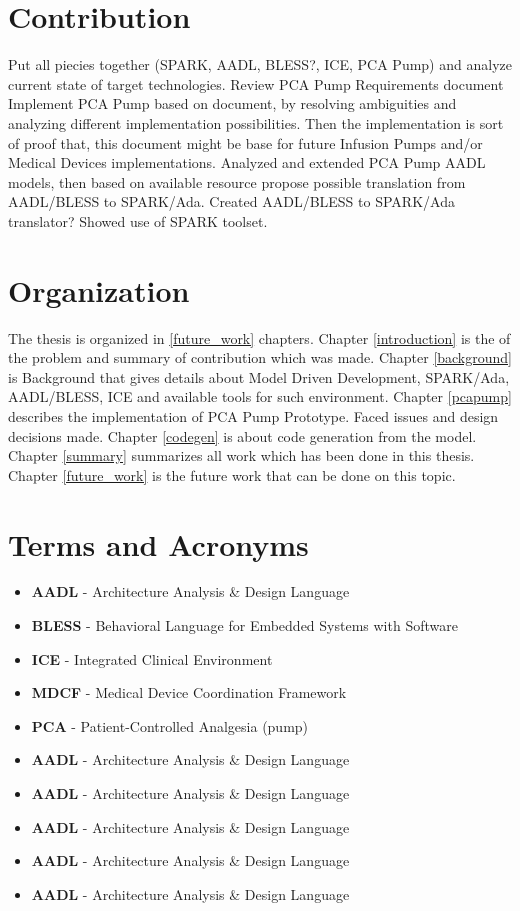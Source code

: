 \section{Contribution}
\label{introduction:contribution}
Put all piecies together (SPARK, AADL, BLESS?, ICE, PCA Pump) and analyze current state of target technologies.
Review PCA Pump Requirements document
Implement PCA Pump based on document, by resolving ambiguities and analyzing different implementation possibilities. Then the implementation is sort of proof that, this document might be base for future Infusion Pumps and/or Medical Devices implementations.
Analyzed and extended PCA Pump AADL models, then based on available resource propose possible translation from AADL/BLESS to SPARK/Ada.
Created AADL/BLESS to SPARK/Ada translator?
Showed use of SPARK toolset.


\section{Organization}
\label{introduction:organization}
The thesis is organized in \ref{future_work} chapters. 
Chapter \ref{introduction} is the of the problem and summary of contribution which was made. 
Chapter \ref{background} is Background that gives details about Model Driven Development, SPARK/Ada, AADL/BLESS, ICE and available tools for such environment. 
Chapter \ref{pcapump} describes the implementation of PCA Pump Prototype. Faced issues and design decisions made.
Chapter \ref{codegen} is about code generation from the model. 
Chapter \ref{summary} summarizes all work which has been done in this thesis. 
Chapter \ref{future_work} is the future work that can be done on this topic.


\section{Terms and Acronyms}
\label{introduction:terms}

\begin{itemize}
	\item \textbf{AADL} - Architecture Analysis \& Design Language
	\item \textbf{BLESS} - Behavioral Language for Embedded Systems with Software
	\item \textbf{ICE} - Integrated Clinical Environment
	\item \textbf{MDCF} - Medical Device Coordination Framework
	\item \textbf{PCA} - Patient-Controlled Analgesia (pump)
	\item \textbf{AADL} - Architecture Analysis \& Design Language
	\item \textbf{AADL} - Architecture Analysis \& Design Language
	\item \textbf{AADL} - Architecture Analysis \& Design Language
	\item \textbf{AADL} - Architecture Analysis \& Design Language
	\item \textbf{AADL} - Architecture Analysis \& Design Language
\end{itemize}